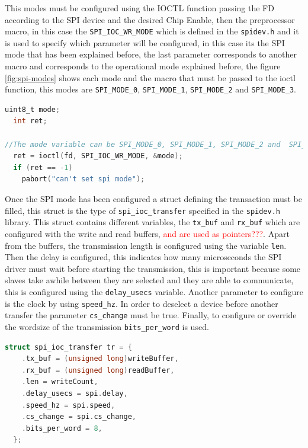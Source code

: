This modes must be configured using the \gls{IOCTL} function passing the \gls{FD} according to the SPI device and the desired Chip Enable, then the preprocessor macro, in this case the \verb!SPI_IOC_WR_MODE! which is defined in the \verb!spidev.h! and it is used to specify which parameter will be configured, in this case its the SPI mode that has been explained before, the last parameter corresponds to another macro and corresponds to the operational mode explained before, the figure \ref{fig:spi-modes} shows each mode and the macro that must be passed to the ioctl function, this modes are \verb!SPI_MODE_0!, \verb!SPI_MODE_1!, \verb!SPI_MODE_2! and \verb!SPI_MODE_3!.

\begin{lstlisting}[language=C, caption={IOSharp.c - SPI Mode configuration}]
uint8_t mode;
  int ret;

//The mode variable can be SPI_MODE_0, SPI_MODE_1, SPI_MODE_2 and  SPI_MODE_3
  ret = ioctl(fd, SPI_IOC_WR_MODE, &mode);
  if (ret == -1)
    pabort("can't set spi mode");
\end{lstlisting}

Once the SPI mode has been configured a struct defining the transaction must be filled, this struct is the type of \verb!spi_ioc_transfer! specified in the \verb!spidev.h! library. This struct contains different variables, the \verb!tx_buf! and \verb!rx_buf! which are configured with the write and read buffers, \textcolor{red}{and are used as pointers???}. Apart from the buffers, the transmission length is configured using the variable \verb!len!. Then the delay is configured, this indicates how many microseconds the SPI driver must wait before starting the transmission, this is important because some slaves take awhile between they are selected and they are able to communicate, this is configured using the \verb!delay_usecs! variable. Another parameter to configure is the clock by using \verb!speed_hz!. In order to deselect a device before another transfer the parameter \verb!cs_change! must be true. Finally, to configure or override the wordsize of the transmission \verb!bits_per_word! is used.

\begin{lstlisting}[language=C, caption={IOSharp.c - SPI struct configuration}]
struct spi_ioc_transfer tr = {
    .tx_buf = (unsigned long)writeBuffer,
    .rx_buf = (unsigned long)readBuffer,
    .len = writeCount,
    .delay_usecs = spi.delay,
    .speed_hz = spi.speed,
    .cs_change = spi.cs_change,
    .bits_per_word = 8,
  };
\end{lstlisting}

